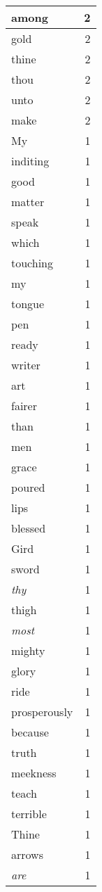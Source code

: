 \begin{center}
\begin{longtable}{l|r}
among & 2\\ \hline 
gold & 2\\ \hline 
thine & 2\\ \hline 
thou & 2\\ \hline 
unto & 2\\ \hline 
make & 2\\ \hline 
My & 1\\ \hline 
inditing & 1\\ \hline 
good & 1\\ \hline 
matter & 1\\ \hline 
speak & 1\\ \hline 
which & 1\\ \hline 
touching & 1\\ \hline 
my & 1\\ \hline 
tongue & 1\\ \hline 
pen & 1\\ \hline 
ready & 1\\ \hline 
writer & 1\\ \hline 
art & 1\\ \hline 
fairer & 1\\ \hline 
than & 1\\ \hline 
men & 1\\ \hline 
grace & 1\\ \hline 
poured & 1\\ \hline 
lips & 1\\ \hline 
blessed & 1\\ \hline 
Gird & 1\\ \hline 
sword & 1\\ \hline 
\emph{thy} & 1\\ \hline 
thigh & 1\\ \hline 
\emph{most} & 1\\ \hline 
mighty & 1\\ \hline 
glory & 1\\ \hline 
ride & 1\\ \hline 
prosperously & 1\\ \hline 
because & 1\\ \hline 
truth & 1\\ \hline 
meekness & 1\\ \hline 
teach & 1\\ \hline 
terrible & 1\\ \hline 
Thine & 1\\ \hline 
arrows & 1\\ \hline 
\emph{are} & 1\\ \hline 

\end{longtable}
\end{center}
